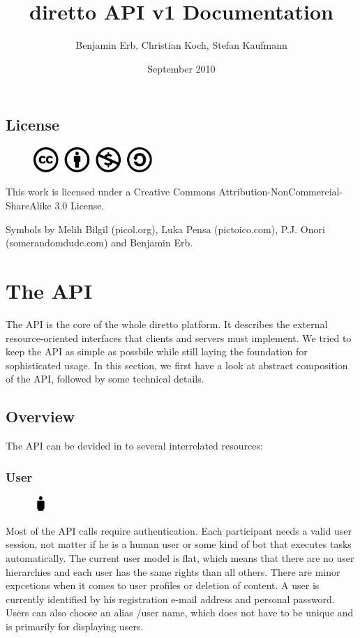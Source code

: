 \documentclass[10pt]{article}
\title{diretto API v1 Documentation}
\author{Benjamin Erb, Christian Koch, Stefan Kaufmann}
\date{September 2010}
\begin{document}
\maketitle

\subsection*{License}
\begin{figure}[!ht]
\begin{center}
\includegraphics[width=0.4\textwidth]{symbols/cc-By-nc-sa}
\end{center}
\end{figure}
This work is licensed under a Creative Commons Attribution-NonCommercial-
ShareAlike 3.0 License.

Symbols by Melih Bilgil (picol.org), Luka Pensa (pictoico.com), P.J. Onori
(somerandomdude.com) and Benjamin Erb.


\setcounter{tocdepth}{1}
\tableofcontents


\section{The API} %
\label{sec:doc_arc_API}

The API is the core of the whole diretto platform. It describes the external resource-oriented interfaces that clients and servers must implement. We tried to keep the API as simple as possbile while still laying the foundation for sophisticated usage. In this section, we first have a look at abstract composition of the API, followed by some technical details.

\subsection{Overview}
The API can be devided in to several interrelated resources:

\subsubsection{User}
\begin{figure}
\includegraphics[width=0.05\textwidth]{symbols/user_half.pdf}
\end{figure}
Most of the API calls require authentication. Each participant needs a valid user session, not matter if he is a human user or some kind of bot that executes tasks automatically. The current user model is flat, which means that there are no user hierarchies and each user has the same rights than all others. There are minor expcetions when it comes to user profiles or deletion of content. A user is currently identified by his registration e-mail address and personal password. Users can also choose an alias /user name, which does not have to be unique and is primarily for displaying users.
\end{document}
